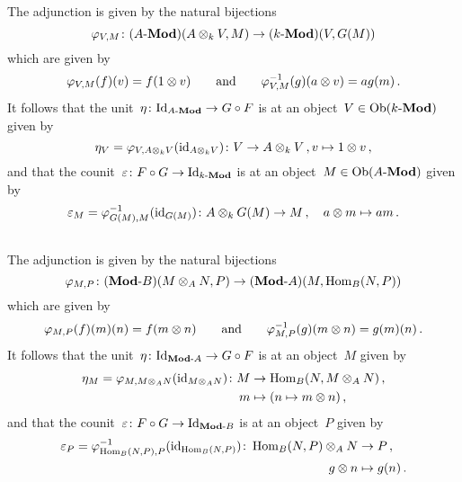 \section{}





\subsection{}

The adjunction is given by the natural bijections
\[
          \varphi_{V,M}
  \colon  (\text{$A$-$\mathbf{Mod}$})(A \otimes_k V, M)
  \to     (\text{$k$-$\mathbf{Mod}$})(V, G(M))
\]
which are given by
\[
    \varphi_{V,M}(f)(v)
  = f(1 \otimes v)
  \qquad\text{and}\qquad
    \varphi_{V,M}^{-1}(g)(a \otimes v)
  = a g(m) \,.
\]
It follows that the unit~$\eta \colon \mathrm{Id}_{\text{$A$-$\mathbf{Mod}$}} \to G \circ F$ is at an object~$V \in \operatorname{Ob}(\text{$k$-$\mathbf{Mod}$})$ given by
\[
          \eta_V
  =       \varphi_{V, A \otimes_k V}( \operatorname{id}_{A \otimes_k V} )
  \colon  V
  \to     A \otimes_k V \,,
  \\
          v
  \mapsto 1 \otimes v \,,
\]
and that the counit~$\varepsilon \colon F \circ G \to \mathrm{Id}_{\text{$k$-$\mathbf{Mod}$}}$ is at an object~$M \in \operatorname{Ob}(\text{$A$-$\mathbf{Mod}$})$ given by
\[
            \varepsilon_M
  =         \varphi_{G(M),M}^{-1}( \operatorname{id}_{G(M)} )
  \colon    A \otimes_k G(M)
  \to       M \,,
  \quad     a \otimes m
  \mapsto   a m \,.
\]




\subsection{}

The adjunction is given by the natural bijections
\[
          \varphi_{M,P}
  \colon  (\text{$\mathbf{Mod}$-$B$})(M \otimes_A N, P)
  \to     (\text{$\mathbf{Mod}$-$A$})(M, \operatorname{Hom}_B(N, P))
\]
which are given by
\[
    \varphi_{M,P}(f)(m)(n)
  = f(m \otimes n)
  \qquad\text{and}\qquad
    \varphi_{M,P}^{-1}(g)(m \otimes n)
  = g(m)(n) \,.
\]
It follows that the unit~$\eta \colon \mathrm{Id}_{\text{$\mathbf{Mod}$-$A$}} \to G \circ F$ is at an object~$M$ given by
\begin{align*}
            \eta_M
   =        \varphi_{M, M \otimes_A N}( \operatorname{id}_{M \otimes_A N} )
   \colon   M
  &\to      \operatorname{Hom}_B(N, M \otimes_A N) \,,
  \\
            m
  &\mapsto  (n \mapsto m \otimes n) \,,
\end{align*}
and that the counit~$\varepsilon \colon F \circ G \to \mathrm{Id}_{\text{$\mathbf{Mod}$-$B$}}$ is at an object~$P$ given by
\begin{align*}
            \varepsilon_P
   =        \varphi_{\operatorname{Hom}_B(N,P), P}^{-1}( \operatorname{id}_{\operatorname{Hom}_B(N,P)} )
   \colon   \operatorname{Hom}_B(N, P) \otimes_A N
  &\to      P \,,
    \\       
            g \otimes n
  &\mapsto  g(n) \,.
\end{align*}





